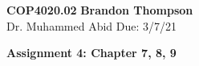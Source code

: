 \noindent
\textbf{COP4020.02} \hfill \textbf{Brandon Thompson} \\
\normalsize Dr. Muhammed Abid \hfill Due: 3/7/21\\

\begin{center}
\textbf{Assignment 4: Chapter 7, 8, 9}
\end{center}